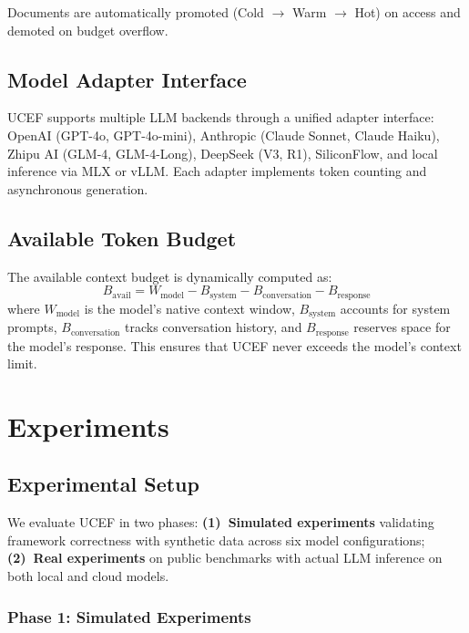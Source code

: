 \documentclass[11pt,a4paper]{article}
\newcommand{\ucef}{\textsf{UCEF}}
\begin{document}
Documents are automatically promoted (Cold $\to$ Warm $\to$ Hot) on access
and demoted on budget overflow.

\subsection{Model Adapter Interface}

\ucef{} supports multiple LLM backends through a unified adapter interface:
OpenAI (GPT-4o, GPT-4o-mini), Anthropic (Claude Sonnet, Claude Haiku),
Zhipu AI (GLM-4, GLM-4-Long), DeepSeek (V3, R1), SiliconFlow, and local
inference via MLX or vLLM.  Each adapter implements token counting and
asynchronous generation.

\subsection{Available Token Budget}

The available context budget is dynamically computed as:
\begin{equation}
  B_{\text{avail}} = W_{\text{model}} - B_{\text{system}}
  - B_{\text{conversation}} - B_{\text{response}}
\end{equation}
where $W_{\text{model}}$ is the model's native context window,
$B_{\text{system}}$ accounts for system prompts,
$B_{\text{conversation}}$ tracks conversation history, and
$B_{\text{response}}$ reserves space for the model's response.
This ensures that \ucef{} never exceeds the model's context limit.


\section{Experiments}
\label{sec:experiments}

\subsection{Experimental Setup}

We evaluate \ucef{} in two phases:
\textbf{(1)~Simulated experiments} validating framework correctness with
synthetic data across six model configurations;
\textbf{(2)~Real experiments} on public benchmarks with actual LLM inference
on both local and cloud models.

\subsubsection{Phase 1: Simulated Experiments}
\end{document}
